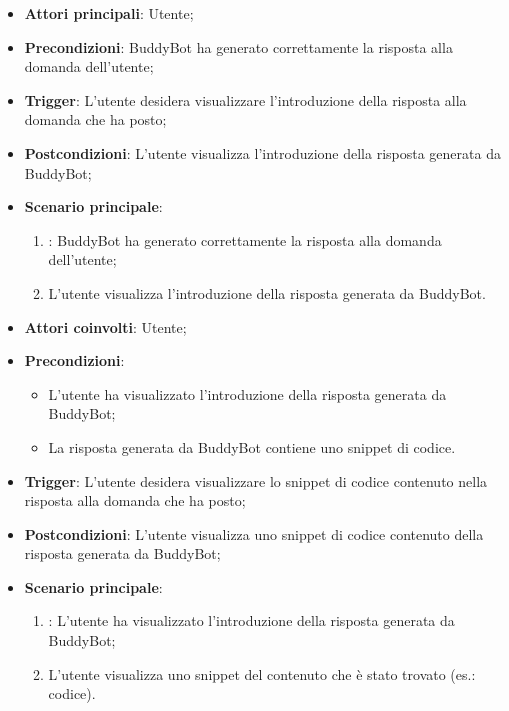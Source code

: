 \begin{itemize}
    \item \textbf{Attori principali}: Utente;
    \item \textbf{Precondizioni}: BuddyBot ha generato correttamente la risposta alla domanda dell'utente;
    \item \textbf{Trigger}: L'utente desidera visualizzare l'introduzione della risposta alla domanda che ha posto;
    \item \textbf{Postcondizioni}: L'utente visualizza l'introduzione della risposta generata da BuddyBot;
    \item \textbf{Scenario principale}:
    \begin{enumerate}
        \item {}: BuddyBot ha generato correttamente la risposta alla domanda dell'utente;
        \item L'utente visualizza l'introduzione della risposta generata da BuddyBot.
    \end{enumerate}
\end{itemize}



\hypertarget{UC5.2}{}

\begin{itemize}
    \item \textbf{Attori coinvolti}: Utente;
    \item \textbf{Precondizioni}: 
    \begin{itemize}
        \item L'utente ha visualizzato l'introduzione della risposta generata da BuddyBot;
        \item La risposta generata da BuddyBot contiene uno snippet di codice.
    \end{itemize}
    \item \textbf{Trigger}: L'utente desidera visualizzare lo snippet di codice contenuto nella risposta alla domanda che ha posto;
    \item \textbf{Postcondizioni}: L'utente visualizza uno snippet di codice contenuto della risposta generata da BuddyBot;
    \item \textbf{Scenario principale}:
    \begin{enumerate}
        \item {}: L'utente ha visualizzato l'introduzione della risposta generata da BuddyBot;
        \item L'utente visualizza uno snippet del contenuto che è stato trovato (es.: codice).
    \end{enumerate}
\end{itemize}



